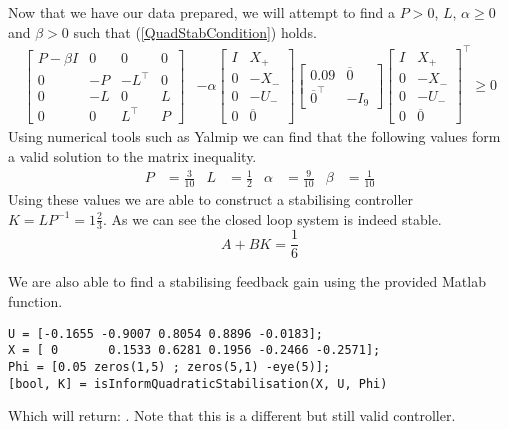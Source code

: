 Now that we have our data prepared, we will attempt to find a $P > 0$, $L$, $\alpha \geq 0$ and $\beta > 0$ such that (\ref{QuadStabCondition}) holds.
\begin{align*}
	\begin{bmatrix}
		P-\beta I&0&0&0\\0&-P&-L^\top&0\\0&-L&0&L\\0&0&L^\top&P
	\end{bmatrix} &- \alpha 
	\begin{bmatrix} I&X_+ \\ 0 & -X_- \\ 0&-U_-\\0&\overline{0} \end{bmatrix}
	\begin{bmatrix} 0.09 & \overline{0} \\ \overline{0}^\top & -I_9 \end{bmatrix}
	\begin{bmatrix} I&X_+ \\ 0 & -X_- \\ 0&-U_-\\0&\overline{0} \end{bmatrix}^\top \geq 0 
\end{align*}
Using numerical tools such as Yalmip we can find that the following values form a valid solution to the matrix inequality.
\begin{align*}
	P &= \frac{3}{10} & L &= \frac{1}{2} & \alpha &= \frac{9}{10} & \beta &= \frac{1}{10}
\end{align*}
Using these values we are able to construct a stabilising controller $K = LP^{-1} = 1\frac{2}{3}$. As we can see the closed loop system is indeed stable.
\begin{equation*}
	A + BK = \frac{1}{6}
\end{equation*}

We are also able to find a stabilising feedback gain using the provided Matlab function.
\begin{lstlisting}
U = [-0.1655 -0.9007 0.8054 0.8896 -0.0183];
X = [ 0       0.1533 0.6281 0.1956 -0.2466 -0.2571];
Phi = [0.05 zeros(1,5) ; zeros(5,1) -eye(5)];
[bool, K] = isInformQuadraticStabilisation(X, U, Phi)
\end{lstlisting}
Which will return: \mon{[ 1, 1.6977 ]}. Note that this is a different but still valid controller.
























